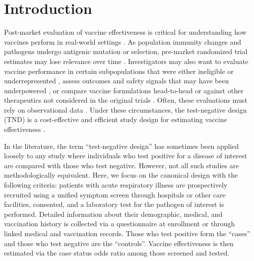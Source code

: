 \documentclass[11pt]{article}
\begin{document}

\section{Introduction} \label{sec:introduction}
Post-market evaluation of vaccine effectiveness is critical for understanding how vaccines perform in real-world settings \cite{patel_postlicensure_2020}. As population immunity changes and pathogens undergo antigenic mutation or selection, pre-market randomized trial estimates may lose relevance over time \cite{hitchings_effectiveness_2021,israel_elapsed_2021}. Investigators may also want to evaluate vaccine performance in certain subpopulations that were either ineligible or underrepresented \cite{olson_effectiveness_2022}, assess outcomes and safety signals that may have been underpowered \cite{thompson_effectiveness_2021}, or compare vaccine formulations head-to-head or against other therapeutics not considered in the original trials \cite{skowronski_two-dose_2022}. Often, these evaluations must rely on observational data \cite{chua_use_2020-1,dean_covid-19_2021}. Under these circumstances, the test-negative design (TND) is a cost-effective and efficient study design for estimating vaccine effectiveness \cite{sullivan_potential_2014,jackson_test-negative_2013}. 
 
In the literature, the term ``test-negative design'' has sometimes been applied loosely to any study where individuals who test positive for a disease of interest are compared with those who test negative. However, not all such studies are methodologically equivalent. Here, we focus on the canonical design with the following criteria: patients with acute respiratory illness are prospectively recruited using a unified symptom screen through hospitals or other care facilities, consented, and a laboratory test for the pathogen of interest is performed. Detailed information about their demographic, medical, and vaccination history is collected via a questionnaire at enrollment or through linked medical and vaccination records. Those who test positive form the ``cases'' and those who test negative are the ``controls''. Vaccine effectiveness is then estimated via the case status odds ratio among those screened and tested.
\end{document}
